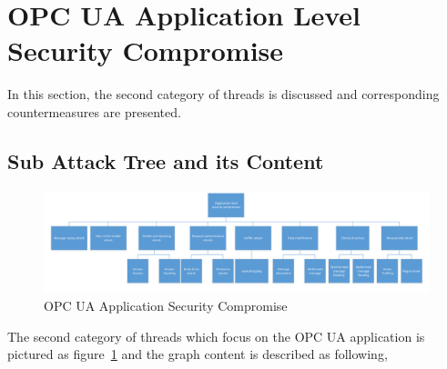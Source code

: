 \section{OPC UA Application Level Security Compromise}
In this section, the second category of threads is discussed and corresponding countermeasures are presented.  
\subsection{Sub Attack Tree and its Content}
 \begin{figure}[!htb]
	\centering
	\includegraphics[width=1.0\textwidth]{attack-tree-application}
		\caption{OPC UA Application Security Compromise}
	\label{fig:attack-tree-application}
\end{figure}
The second category of threads which focus on the OPC UA application is pictured as figure~\ref{fig:attack-tree-application} and  the graph content is described as following,

